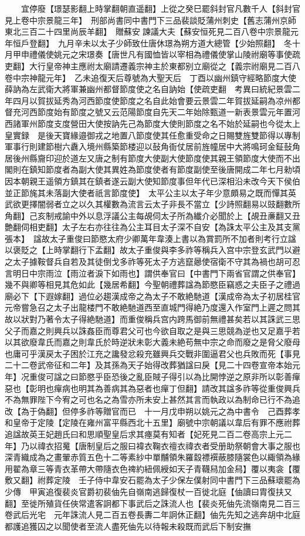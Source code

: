 　　宜停廢【璟瑟影翻上時掌翻朝直遥翻】上從之癸巳罷斜封官凡數千人【斜封官見上卷中宗景龍三年】　刑部尚書同中書門下三品裴談貶蒲州刺史【舊志蒲州京師東北三百二十四里尚辰羊翻】　贈蘇安諫議大夫【蘇安恒死見二百八卷中宗景龍元年恒戶登翻】　九月辛未以太子少師致仕唐休璟為朔方道大總管【少始照翻】　冬十月甲申禮儀使姚元之宋璟奏【唐世凡有國恤皆以宰相為禮儀使掌山陵祔廟等事使疏吏翻】大行皇帝神主應祔太廟請遷義宗神主於東都别立廟從之【義宗祔廟見二百八卷中宗神龍元年】　乙未追復天后尊號為大聖天后　丁酉以幽州鎮守經略節度大使薛訥為左武衛大將軍兼幽州都督節度使之名自訥始【使疏吏翻　考異曰統紀景雲二年四月以賀拔延秀為河西節度使節度之名自此始會要云景雲二年賀拔延嗣為凉州都督充河西節度始有節度之號又云范陽節度自先天二年始除甄道一新表景雲元年置河西諸軍州節度支度營田大使按訥先己為節度大使則節度之名不始於延嗣也今從太上皇實録　是後天寶緣邉御戎之地置八節度使其任愈重受命之日賜雙旌雙節得以專制軍事行則建節樹六纛入境州縣築節楼迎以鼔角衙仗居前旌幢居中大將鳴珂金鉦鼔角居後州縣齎印迎於道左又唐之制有節度大使副大使節度使其親王領節度大使而不出閣則在鎮知節度者為副大使其異姓為節度使者有節度副使至後唐開成二年七月勑頃因本朝親王遥領方鎮其在鎮者遂云副大使知節度事但年代已深相沿未改今天下侯伯並正節旄其未落副大使者祇言節度使】　太平公主以太子年少意頗易之既而憚其英武欲更擇闇弱者立之以久其權數為流言云太子非長不當立【少詩照翻易以豉翻數所角翻】己亥制戒諭中外以息浮議公主每覘伺太子所為纎介必聞於上【覘丑亷翻又丑艶翻伺相吏翻】太子左右亦往往為公主耳目太子深不自安【為誅太平公主及其支黨張本】　諡故太子重俊曰節愍太府少卿萬年韋湊上書以為賞罰所不加者則考行立諡以褒貶之【上時掌翻行下孟翻】故太子重俊與李多祚等稱兵入宫中宗登玄武門以避之太子據鞍督兵自若及其徒倒戈多祚等死太子方逃竄曏使宿衛不守其為禍也胡可忍言明日中宗雨泣【雨泣者淚下如雨也】謂供奉官曰【中書門下兩省官謂之供奉官】幾不與卿等相見其危如此【幾居希翻】今聖朝禮葬諡為節愍臣竊惑之夫臣子之禮過廟必下【下遐嫁翻】過位必趨漢成帝之為太子不敢絶馳道【漢成帝為太子初居桂官元帝嘗急召之太子出龍楼門不敢絶馳道西至直城門得絶乃度還入作室門上遲之問其故以狀對乃著令太子得絶馳道】而重俊稱兵宫内跨馬御前無禮甚矣若以其誅武三思父子而嘉之則興兵以誅姦臣而尊君父可也今欲自取之是與三思競為逆也又足嘉乎若以其欲廢韋氏而嘉之則韋氏於時逆狀未彰大義未絶苟無中宗之命而廢之是脅父廢母也庸可乎漢戻太子困於江充之讒發忿殺充雖興兵交戰非圍逼君父也兵敗而死【事見二十二卷武帝征和二年】及其孫為天子始得改葬猶諡曰戾【見二十四卷宣帝本始元年】况重俊可諡之曰節愍乎臣恐後之亂臣賊子得引以為比開悖逆之原非所以彰善癉惡也【彰明也癉病也明其為善病其為惡者也癉丁但翻】請改其諡多祚等從重俊興兵不為無罪陛下今宥之可也名之為雪亦所未安上甚然其言而執政以為制命已行不為追改【為于偽翻】但停多祚等贈官而已　十一月戊申朔以姚元之為中書令　己酉葬孝和皇帝于定陵【定陵在雍州富平縣西北十五里】廟號中宗朝議以韋后有罪不應祔葬追諡故英王妃趙氏曰和思順聖皇后求其瘞莫有知者【妃死見二百二卷高宗上元二年】乃以禕衣招䰟【唐制皇后之服曰褘衣鞠衣䄠衣禕衣者受册助祭朝會大事之服也深青織成為之畫翬赤質五色十二等素紗中單黼領朱羅縠褾襈蔽膝隨裳色以緅領為緣用翟為章三等青衣革帶大帶隨衣色禆約紐佩綬如天子青韈舄加金舄】覆以夷衾【覆敷又翻】祔葬定陵　壬子侍中韋安石罷為太子少保左僕射同中書門下三品蘇瓌罷為少傳　甲寅追復裴炎官爵初裴伷先自嶺南逃歸復杖一百徙北庭【伷讀曰胄復扶又翻】至徙所殖貨任俠常遣客詗都下事武后之誅流人也【裴炎死伷先流嶺南見二百三卷武后光宅　元年誅流人見二百五卷長夀二年詗休正翻】伷先先知之逃奔胡中北庭都護追獲囚之以聞使者至流人盡死伷先以待報未殺既而武后下制安撫
